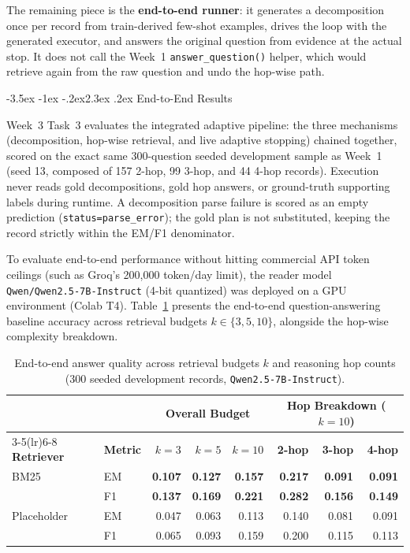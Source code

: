 \documentclass[11pt,a4paper]{article}
\makeatletter
\renewcommand\section{\@startsection{section}{1}{\z@}%
  {-3.5ex \@plus -1ex \@minus -.2ex}{2.3ex \@plus.2ex}%
  {\color{ink}\normalfont\Large\bfseries}}
\newcommand{\code}[1]{\texttt{\small #1}}
\makeatother
\begin{document}
The remaining piece is the \textbf{end-to-end runner}: it generates a
decomposition once per record from train-derived few-shot examples, drives the
loop with the generated executor, and answers the original question from
evidence at the actual stop. It does not call the Week~1 \code{answer\_question()}
helper, which would retrieve again from the raw question and undo the hop-wise
path.

\section{End-to-End Results}

Week~3 Task~3 evaluates the integrated adaptive pipeline: the three mechanisms (decomposition, hop-wise retrieval, and live adaptive stopping) chained together, scored on the exact same 300-question seeded development sample as Week~1 (seed 13, composed of 157 2-hop, 99 3-hop, and 44 4-hop records). Execution never reads gold decompositions, gold hop answers, or ground-truth supporting labels during runtime. A decomposition parse failure is scored as an empty prediction (\code{status=parse\_error}); the gold plan is not substituted, keeping the record strictly within the EM/F1 denominator.

To evaluate end-to-end performance without hitting commercial API token ceilings (such as Groq's 200,000 token/day limit), the reader model \code{Qwen/Qwen2.5-7B-Instruct} (4-bit quantized) was deployed on a GPU environment (Colab T4). Table~\ref{tab:end_to_end_results} presents the end-to-end question-answering baseline accuracy across retrieval budgets $k \in \{3, 5, 10\}$, alongside the hop-wise complexity breakdown.

\begin{table}[H]
\centering
\caption{End-to-end answer quality across retrieval budgets $k$ and reasoning hop counts (300 seeded development records, \code{Qwen2.5-7B-Instruct}).}
\label{tab:end_to_end_results}
\begin{tabular}{llrrrrrr}
\toprule
& & \multicolumn{3}{c}{\textbf{Overall Budget}} & \multicolumn{3}{c}{\textbf{Hop Breakdown ($k=10$)}} \\
\cmidrule(lr){3-5}\cmidrule(lr){6-8}
\textbf{Retriever} & \textbf{Metric} & $k=3$ & $k=5$ & $k=10$ & \textbf{2-hop} & \textbf{3-hop} & \textbf{4-hop} \\
\midrule
BM25 & EM & \textbf{0.107} & \textbf{0.127} & \textbf{0.157} & \textbf{0.217} & \textbf{0.091} & \textbf{0.091} \\
     & F1 & \textbf{0.137} & \textbf{0.169} & \textbf{0.221} & \textbf{0.282} & \textbf{0.156} & \textbf{0.149} \\
\midrule
Placeholder & EM & 0.047 & 0.063 & 0.113 & 0.140 & 0.081 & 0.091 \\
            & F1 & 0.065 & 0.093 & 0.159 & 0.200 & 0.115 & 0.113 \\
\bottomrule
\end{tabular}
\end{table}
\end{document}
